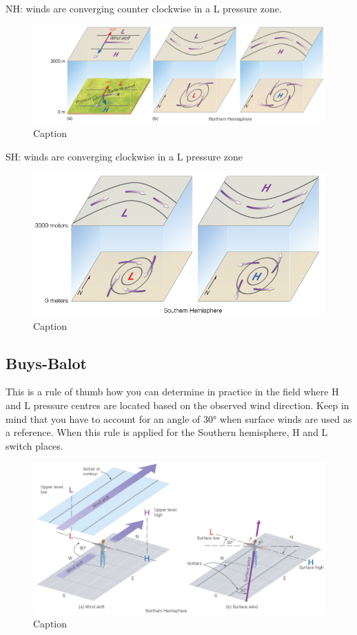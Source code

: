 \documentclass[oneside]{book}
\begin{document}
NH: winds are converging counter clockwise in a L pressure zone.

\begin{figure}

{\centering \includegraphics[width=0.4\linewidth]{figures/Figure413} 

}

\caption{Caption}\label{fig:CW}
\end{figure}

SH: winds are converging clockwise in a L pressure zone

\begin{figure}

{\centering \includegraphics[width=0.4\linewidth]{figures/Figure414} 

}

\caption{Caption}\label{fig:ACW}
\end{figure}

\subsection{Buys-Balot}\label{buys-balot}

This is a rule of thumb how you can determine in practice in the field
where H and L pressure centres are located based on the observed wind
direction. Keep in mind that you have to account for an angle of 30°
when surface winds are used as a reference. When this rule is applied
for the Southern hemisphere, H and L switch places.

\begin{figure}

{\centering \includegraphics[width=0.4\linewidth]{figures/Figure415} 

}

\caption{Caption}\label{fig:Buys}
\end{figure}
\end{document}
